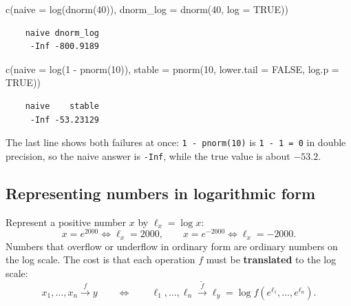 \documentclass[
  letterpaper,
  DIV=11,
  numbers=noendperiod]{scrreprt}
\newenvironment{Shaded}{\begin{snugshade}}{\end{snugshade}}
\newcommand{\AttributeTok}[1]{\textcolor[rgb]{0.40,0.45,0.13}{#1}}
\newcommand{\ConstantTok}[1]{\textcolor[rgb]{0.56,0.35,0.01}{#1}}
\newcommand{\DecValTok}[1]{\textcolor[rgb]{0.68,0.00,0.00}{#1}}
\newcommand{\FunctionTok}[1]{\textcolor[rgb]{0.28,0.35,0.67}{#1}}
\newcommand{\NormalTok}[1]{\textcolor[rgb]{0.00,0.23,0.31}{#1}}
\newcommand{\SpecialCharTok}[1]{\textcolor[rgb]{0.37,0.37,0.37}{#1}}
\begin{document}
\begin{Shaded}
\begin{Highlighting}[]
\FunctionTok{c}\NormalTok{(}\AttributeTok{naive =} \FunctionTok{log}\NormalTok{(}\FunctionTok{dnorm}\NormalTok{(}\DecValTok{40}\NormalTok{)), }\AttributeTok{dnorm\_log =} \FunctionTok{dnorm}\NormalTok{(}\DecValTok{40}\NormalTok{, }\AttributeTok{log =} \ConstantTok{TRUE}\NormalTok{))}
\end{Highlighting}
\end{Shaded}

\begin{verbatim}
    naive dnorm_log 
     -Inf -800.9189 
\end{verbatim}

\begin{Shaded}
\begin{Highlighting}[]
\FunctionTok{c}\NormalTok{(}\AttributeTok{naive =} \FunctionTok{log}\NormalTok{(}\DecValTok{1} \SpecialCharTok{{-}} \FunctionTok{pnorm}\NormalTok{(}\DecValTok{10}\NormalTok{)), }\AttributeTok{stable =} \FunctionTok{pnorm}\NormalTok{(}\DecValTok{10}\NormalTok{, }\AttributeTok{lower.tail =} \ConstantTok{FALSE}\NormalTok{, }\AttributeTok{log.p =} \ConstantTok{TRUE}\NormalTok{))}
\end{Highlighting}
\end{Shaded}

\begin{verbatim}
    naive    stable 
     -Inf -53.23129 
\end{verbatim}

The last line shows both failures at once: \texttt{1\ -\ pnorm(10)} is
\texttt{1\ -\ 1\ =\ 0} in double precision, so the naive answer is
\texttt{-Inf}, while the true value is about \(-53.2\).

\subsection{Representing numbers in logarithmic
form}\label{representing-numbers-in-logarithmic-form}

Represent a positive number \(x\) by \(\ell_x = \log x\): \[
x = e^{2000} \iff \ell_x = 2000, \qquad x = e^{-2000} \iff \ell_x = -2000 .
\] Numbers that overflow or underflow in ordinary form are ordinary
numbers on the log scale. The cost is that each operation \(f\) must be
\textbf{translated} to the log scale: \[
x_1,\dots,x_n \xrightarrow{\;f\;} y \qquad\Longleftrightarrow\qquad \ell_1,\dots,\ell_n \xrightarrow{\;\tilde f\;} \ell_y = \log f(e^{\ell_1},\dots,e^{\ell_n}).
\]
\end{document}
